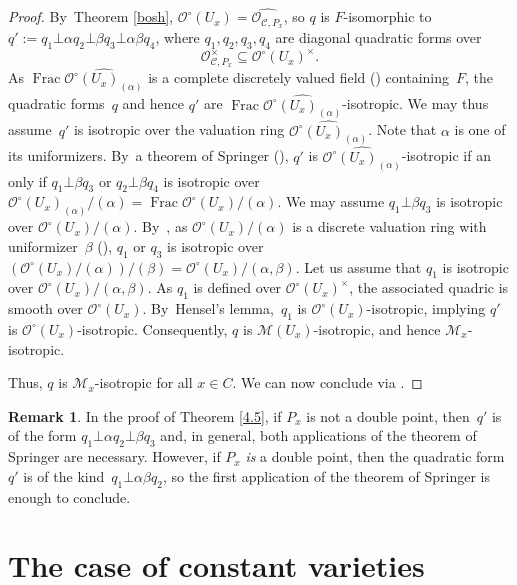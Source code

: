 \documentclass[JEP,XML,SOM,Unicode,NoFloatCountersInSection,published]{cedram}
\DeclareMathOperator{\Frac}{Frac}
\theoremstyle{definition}
\newtheorem{rem}[thm]{Remark}
\begin{document}
\begin{proof}
By~Theorem \ref{bosh}, $\mathcal{O}^{\circ}(U_x)\!=\!\widehat{\mathcal{O}_{\mathscr{C}, P_x}}$, so $q$ is $F$-isomorphic to
$
q'\!:=\!q_1 \bot \alpha q_2 \bot \beta q_3 \bot \alpha\beta q_4
$,
where $q_1, q_2, q_3, q_4$ are diagonal quadratic forms over
\[
\mathcal{O}_{\mathscr{C}, P_x}^{\times} \!\subseteq \mathcal{O}^{\circ}(U_x)^{\times}.
\]
As $\Frac \widehat{\mathcal{O}^{\circ}(U_x)_{(\alpha)}}$ is a complete discretely valued field (\cite[Tag\,0AFS]{stacks}) containing~$F$, the quadratic forms~$q$ and hence $q'$ are $\Frac \widehat{\mathcal{O}^{\circ}(U_x)_{(\alpha)}}$-isotropic.
We may thus assu\-me~$q'$ is isotropic over the valuation ring $\widehat{\mathcal{O}^{\circ}(U_x)_{(\alpha)}}$. Note that $\alpha$ is one of its uniformizers. By~a theorem of Springer (\cite[VI, Prop.\,1.9]{lam}), $q'$ is $\widehat{\mathcal{O}^{\circ}(U_x)_{(\alpha)}}$-isotropic if an only if $q_1 \bot \beta q_3$ or $q_2 \bot \beta q_4$ is isotropic over $\mathcal{O}^{\circ}(U_x)_{(\alpha)}/(\alpha)=\Frac \mathcal{O}^{\circ}(U_x)/(\alpha)$. We may assume $q_1 \bot \beta q_3$ is isotropic over $\mathcal{O}^{\circ}(U_x)/(\alpha)$. By~\loccit, as $\mathcal{O}^{\circ}(U_x)/(\alpha)$ is a discrete valuation ring with uniformizer~$\beta$ (\cite[Tag\,00NQ]{stacks}), $q_1$ or $q_3$ is isotropic over $(\mathcal{O}^{\circ}(U_x)/(\alpha))/(\beta)=\mathcal{O}^{\circ}(U_x)/(\alpha, \beta)$. Let us assume that $q_1$ is isotropic over $\mathcal{O}^{\circ}(U_x)/(\alpha, \beta)$. As $q_1$ is defined over $\mathcal{O}^{\circ}(U_x)^{\times}$, the associated quadric is smooth over $\mathcal{O}^{\circ}(U_x)$. By~Hensel's lemma,~$q_1$ is $\mathcal{O}^{\circ}(U_x)$-isotropic, implying $q'$ is $\mathcal{O}^{\circ}(U_x)$-isotropic. Consequently, $q$ is $\mathscr{M}(U_x)$-isotropic, and hence $\mathscr{M}_x$-isotropic.

Thus, $q$ is $\mathscr{M}_x$-isotropic for all $x \in C$. We can now conclude via \cite[Th.\,3.12]{une}.
\end{proof}

\begin{rem}\label{4.6}
In the proof of Theorem \ref{4.5}, if $P_x$ is not a double point, then~$q'$ is of the form $q_1 \bot \alpha q_2 \bot \beta q_3$ and, in general, both applications of the theorem of Springer are necessary. However, if $P_x$ \emph{is} a double point, then the quadratic form $q'$ is of the kind~$q_1 \bot \alpha \beta q_2$, so the first application of the theorem of Springer is enough to conclude.
\end{rem}

\section{The case of constant varieties} \label{seksioni5}
\end{document}
